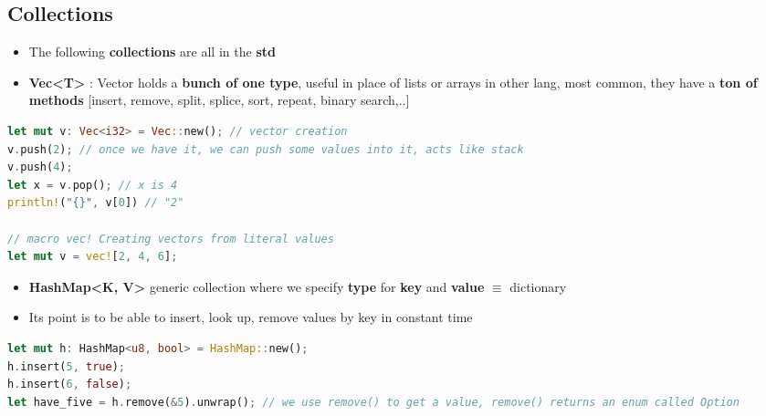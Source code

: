 \documentclass{report}
\begin{document}
\begin{multicols*}{2}
\section{Collections}

\begin{itemize}
  \item The following \textbf{collections} are all in the \textbf{std}
  \item \textbf{Vec<T>} : Vector holds a \textbf{bunch of one type}, useful in place of lists or arrays in other lang, most common, they have a \textbf{ton of methods} [insert, remove, split, splice, sort, repeat, binary search,..]
\end{itemize}

\begin{tcolorbox}[title=Examples,colback=backcolour,size=small,left=4mm]
\begin{lstlisting}[language=rust]
let mut v: Vec<i32> = Vec::new(); // vector creation
v.push(2); // once we have it, we can push some values into it, acts like stack
v.push(4);
let x = v.pop(); // x is 4
println!("{}", v[0]) // "2"

// macro vec! Creating vectors from literal values
let mut v = vec![2, 4, 6];
\end{lstlisting}
\end{tcolorbox}

\begin{itemize}
  \item \textbf{HashMap<K, V>} generic collection where we specify \textbf{type} for \textbf{key} and \textbf{value} $\equiv $ dictionary 
  \item Its point is to be able to insert, look up, remove values by key in constant time
\end{itemize}

\begin{tcolorbox}[title=Examples,colback=backcolour,size=small,left=4mm]
\begin{lstlisting}[language=rust]
let mut h: HashMap<u8, bool> = HashMap::new();
h.insert(5, true);
h.insert(6, false);
let have_five = h.remove(&5).unwrap(); // we use remove() to get a value, remove() returns an enum called Option
\end{lstlisting}
\end{tcolorbox}


\end{multicols*}
\end{document}
